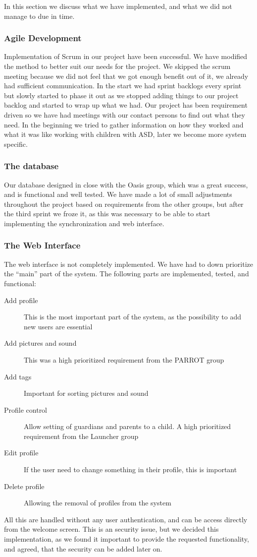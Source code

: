 In this section we discuss what we have implemented, and what we did not manage to due in time.

\subsubsection*{Agile Development}
Implementation of Scrum in our project have been successful. We have modified the method to better suit our needs for the project. We skipped the scrum meeting because we did not feel that we got enough benefit out of it, we already had sufficient communication. In the start we had sprint backlogs every sprint but slowly started to phase it out as we stopped adding things to our project backlog and started to wrap up what we had. Our project has been requirement driven so we have had meetings with our contact persons to find out what they need. In the beginning we tried to gather information on how they worked and what it was like working with children with ASD, later we become more system specific. 

\subsubsection*{The database}
Our database designed in close with the Oasis group, which was a great success, and is functional and well tested. We have made a lot of small adjustments throughout the project based on requirements from the other groups, but after the third sprint we froze it, as this was necessary to be able to start implementing the synchronization and web interface.

\subsubsection*{The Web Interface}
The web interface is not completely implemented. We have had to down prioritize the ``main'' part of the system. The following parts are implemented, tested, and functional:
\begin{description}
	\item[Add profile] This is the most important part of the system, as the possibility to add new users are essential
	\item[Add pictures and sound] This was a high prioritized requirement from the PARROT group
	\item[Add tags] Important for sorting pictures and sound
	\item[Profile control] Allow setting of guardians and parents to a child. A high prioritized requirement from the Launcher group
	\item[Edit profile] If the user need to change something in their profile, this is important
	\item[Delete profile] Allowing the removal of profiles from the system
\end{description}
All this are handled without any user authentication, and can be access directly from the welcome screen. This is an security issue, but we decided this implementation, as we found it important to provide the requested functionality, and agreed, that the security can be added later on.

